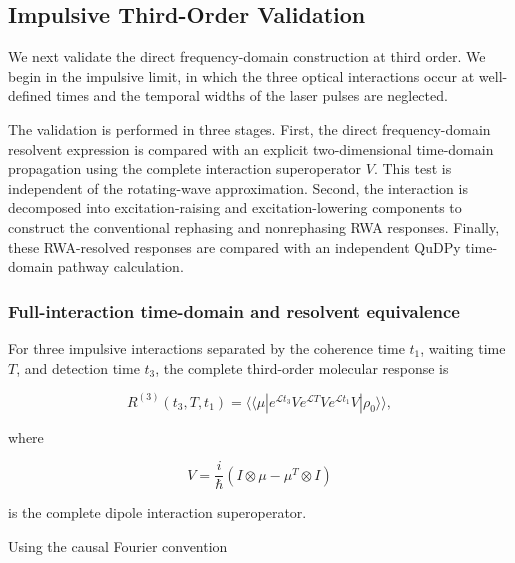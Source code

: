 \documentclass[11pt]{article}
\begin{document}
\subsection{Impulsive Third-Order Validation}
\label{subsec:third_order_impulsive}

We next validate the direct frequency-domain construction at third
order.  We begin in the impulsive limit, in which the three optical
interactions occur at well-defined times and the temporal widths of the
laser pulses are neglected.

The validation is performed in three stages.  First, the direct
frequency-domain resolvent expression is compared with an explicit
two-dimensional time-domain propagation using the complete interaction
superoperator $V$.  This test is independent of the rotating-wave
approximation.  Second, the interaction is decomposed into
excitation-raising and excitation-lowering components to construct the
conventional rephasing and nonrephasing RWA responses.  Finally, these
RWA-resolved responses are compared with an independent QuDPy
time-domain pathway calculation.


\subsubsection{Full-interaction time-domain and resolvent equivalence}

For three impulsive interactions separated by the coherence time
$t_1$, waiting time $T$, and detection time $t_3$, the complete
third-order molecular response is

\begin{equation}
R^{(3)}(t_3,T,t_1)
=
\langle\!\langle \mu |
e^{\mathcal{L}t_3}
V
e^{\mathcal{L}T}
V
e^{\mathcal{L}t_1}
V
|\rho_0\rangle\!\rangle ,
\label{eq:third_order_impulsive_td}
\end{equation}

where

\begin{equation}
V
=
\frac{i}{\hbar}
\left(
I\otimes\mu-\mu^{T}\otimes I
\right)
\end{equation}

is the complete dipole interaction superoperator.

Using the causal Fourier convention
\end{document}
